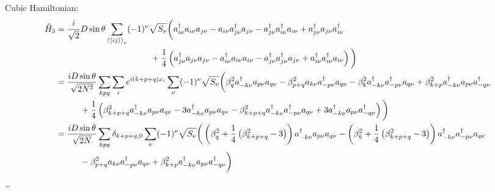 \documentclass{article}
\begin{document}
Cubic Hamiltonian:
\begin{align}
	\hat H_3 &= \frac{i}{\sqrt 2} D \sin\theta \sum_{\braket{\braket{ij}}_\nu} (-1)^\nu \sqrt{S_\nu} \bigg( a_{i\nu}^\dagger a_{i\nu} a_{j\nu} - a_{i\nu} a_{j\nu}^\dagger a_{j\nu} - a_{j\nu}^\dagger a_{i\nu}^\dagger a_{i\nu} + a_{j\nu}^\dagger a_{j\nu} a_{i\nu}^\dagger \\
	&\hspace{3.9cm} + \frac{1}{4} \left( a_{j\nu}^\dagger a_{j\nu} a_{j\nu} - a_{i\nu}^\dagger a_{i\nu} a_{i\nu} - a_{j\nu}^\dagger a_{j\nu}^\dagger a_{j\nu} + a_{i\nu}^\dagger a_{i\nu}^\dagger a_{i\nu}  \right) \bigg) \\
%
	&= \frac{i D \sin\theta}{\sqrt{2N^3}}  \sum_{kpq} \sum_i e^{i(k+p+q)x_i} \sum_{\nu} (-1)^\nu \sqrt{S_\nu} \bigg( \beta_q^2 a_{-k\nu}^\dagger a_{p\nu} a_{q\nu} - \beta_{p+q}^2 a_{k\nu} a_{-p\nu}^\dagger a_{q\nu} - \beta_{k}^2 a_{-k\nu}^\dagger a_{-p\nu}^\dagger a_{q\nu} + \beta_{k+p}^2 a_{-k\nu}^\dagger a_{p\nu} a_{-q\nu}^\dagger \\
	&\hspace{1cm} +\frac{1}{4} \left( \beta_{k+p+q}^2 a_{-k\nu}^\dagger a_{p\nu} a_{q\nu} - 3 a_{-k\nu}^\dagger a_{p\nu} a_{q\nu} - \beta_{k+p+q}^2 a_{-k\nu}^\dagger a_{-p\nu}^\dagger a_{q\nu} + 3 a_{-k\nu}^\dagger a_{p\nu} a_{-q\nu}^\dagger \right) \bigg) \\
%
	&= \frac{i D \sin\theta}{\sqrt{2N}} \sum_{kpq} \delta_{k+p+q,0} \sum_\nu (-1)^\nu \sqrt{S_\nu} \bigg( \left( \beta_q^2 + \frac{1}{4} \left( \beta_{k+p+q}^2 - 3 \right) \right) a_{-k\nu}^\dagger a_{p\nu} a_{q\nu} - \left( \beta_k^2 + \frac{1}{4} \left( \beta_{k+p+q}^2 - 3 \right) \right) a_{-k\nu}^\dagger a_{-p\nu}^\dagger a_{q\nu} \\
	&\hspace{1cm} - \beta_{p+q}^2 a_{k\nu} a_{-p\nu}^\dagger a_{q\nu} + \beta_{k+p}^2 a_{-k\nu}^\dagger a_{p\nu} a_{-q\nu}^\dagger \bigg)
\end{align}
\dots
\end{document}
